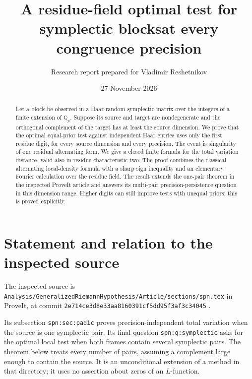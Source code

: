 \documentclass[11pt]{article}
\title{A residue-field optimal test for symplectic blocks\newline at every congruence precision}
\author{Research report prepared for Vladimir Reshetnikov}
\date{27 November 2026}
\begin{document}
\maketitle
\begin{abstract}
Let a block be observed in a Haar-random symplectic matrix over the integers of a finite extension of $\mathbb Q_p$. Suppose its source and target are nondegenerate and the orthogonal complement of the target has at least the source dimension. We prove that the optimal equal-prior test against independent Haar entries uses only the first residue digit, for every source dimension and every precision. The event is singularity of one residual alternating form. We give a closed finite formula for the total variation distance, valid also in residue characteristic two. The proof combines the classical alternating local-density formula with a sharp sign inequality and an elementary Fourier calculation over the residue field. The result extends the one-pair theorem in the inspected ProveIt article and answers its multi-pair precision-persistence question in this dimension range. Higher digits can still improve tests with unequal priors; this is proved explicitly.
\end{abstract}

\section{Statement and relation to the inspected source}
The inspected source is \texttt{Analysis/GeneralizedRiemannHypothesis/Article/sections/spn.tex} in ProveIt, at commit\newline
\texttt{2e714ce3d8e33aa8160391cf5dd95f3af3c34045} \cite{repo}.

Its subsection \texttt{spn:sec:padic} proves precision-independent total variation when the source is one symplectic pair. Its final question \texttt{spn:q:symplectic} asks for the optimal local test when both frames contain several symplectic pairs. The theorem below treats every number of pairs, assuming a complement large enough to contain the source. It is an unconditional extension of a method in that directory; it uses no assertion about zeros of an $L$-function.
\end{document}
